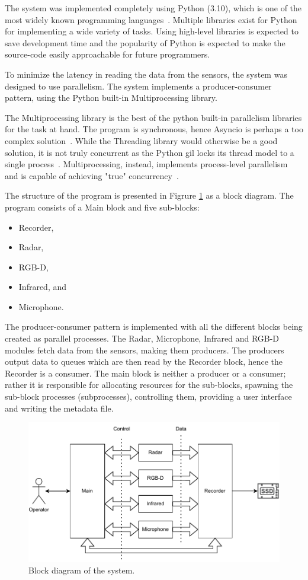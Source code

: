 The system was implemented completely using Python (3.10),
which is one of the most widely known programming languages~\cite{developer-survey}.
Multiple libraries exist for Python for implementing a wide variety of tasks.
Using high-level libraries is expected to save development time and the popularity of Python
is expected to make the source-code easily approachable for future programmers.

To minimize the latency in reading the data from the sensors,
the system was designed to use parallelism.
The system implements a producer-consumer pattern,
using the Python built-in Multiprocessing library.

The Multiprocessing library is the best of the python built-in parallelism libraries for the task at hand.
The program is synchronous, hence Asyncio is perhaps a too complex solution~\cite{python-asyncio}.
While the Threading library would otherwise be a good solution,
it is not truly concurrent as the Python \gls{gil} locks its thread model to a single process~\cite{python-threading}.
Multiprocessing, instead, implements process-level parallelism and is capable of achieving "true" concurrency~\cite{python-multiprocessing}.

The structure of the program is presented in Figrure \ref{fig:3-block-diagram} as a block diagram.
The program consists of a Main block and five sub-blocks:
\begin{itemize}
    \item Recorder,
    \item Radar,
    \item RGB-D,
    \item Infrared, and
    \item Microphone.
\end{itemize}

The producer-consumer pattern is implemented with all the different blocks being created as parallel processes.
The Radar, Microphone, Infrared and RGB-D modules fetch data from the sensors, making them producers.
The producers output data to queues which are then read by the Recorder block,
hence the Recorder is a consumer.
The main block is neither a producer or a consumer; rather it is responsible for allocating resources for the sub-blocks,
spawning the sub-block processes (subprocesses), controlling them, providing a user interface and writing the metadata file.

\begin{figure}[h]
    \centering
    \includegraphics[width=.8\textwidth]{fig/3/block-diagram.pdf}
    \caption{Block diagram of the system.}
    \label{fig:3-block-diagram}
\end{figure}

